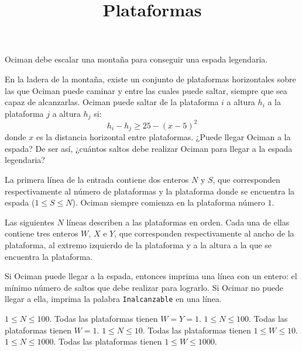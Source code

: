 \documentclass{oci}
\title{Plataformas}
\begin{document}
\begin{problemDescription}
Ociman debe escalar una montaña para conseguir una espada legendaria.

En la ladera de la montaña, existe un conjunto de plataformas horizontales sobre las que Ociman puede caminar y entre las cuales puede saltar, siempre que sea capaz de alcanzarlas.
Ociman puede saltar de la plataforma $i$ a altura $h_i$ a la plataforma $j$ a altura $h_j$ si:
$$h_i - h_j \ge 25-(x-5)^2$$
donde $x$ es la distancia horizontal entre plataformas.
¿Puede llegar Ociman a la espada? De ser así, ¿cuántos saltos debe realizar Ociman para llegar a la espada legendaria?

\end{problemDescription}

\begin{inputDescription}
La primera línea de la entrada contiene dos enteros $N$ y $S$, que corresponden respectivamente al número de plataformas y la plataforma donde se encuentra la espada ($1 \le S \le N$).
Ociman siempre comienza en la plataforma número $1$.

Las siguientes $N$ líneas describen a las plataformas en orden.
Cada una de ellas contiene tres enteros $W$, $X$ e $Y$, que corresponden respectivamente al ancho de la plataforma, al extremo izquierdo de la plataforma y a la altura a la que se encuentra la plataforma.
\end{inputDescription}

\begin{outputDescription}
Si Ociman puede llegar a la espada, entonces imprima una línea con un entero: el mínimo número de saltos que debe realizar para lograrlo. Si Ocimar no puede llegar a ella, imprima la palabra \verb-Inalcanzable- en una línea.
\end{outputDescription}

\begin{scoreDescription}
   $1 \le N \le 100$. Todas las plataformas tienen $W=Y=1$.
   $1 \le N \le 100$. Todas las plataformas tienen $W=1$.
   $1 \le N \le 10$. Todas las plataformas tienen $1 \le W \le 10$.
   $1 \le N \le 1000$. Todas las plataformas tienen $1 \le W \le 1000$.
\end{scoreDescription}

\begin{sampleDescription}
\end{sampleDescription}
\end{document}
